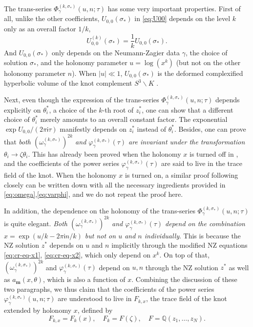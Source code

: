 \documentclass[a4paper,11pt]{article}	%
\def\IQ{\mathbb{Q}}
\newcommand{\ri}{{\mathsf{i}}}
\newcommand{\s}{\sigma}
\begin{document}
The trans-series $\Phi_\gamma^{(k,\sigma_*)}(u,n;\tau)$ has some very
important properties.
%
First of all, unlike the other coefficients, $U_{0,0}(\sigma_*)$ in
\eqref{eq:U00} depends on the level $k$ only as an overall factor
$1/k$,
\begin{equation}
  U^{(k)}_{0,0}(\sigma_*) = \frac{1}{k} U_{0,0}(\sigma_*).
  \label{eq:U00k}
\end{equation}
And $U_{0,0}(\sigma_*)$ only depends on the Neumann-Zagier data
$\gamma$, the choice of solution $\sigma_*$, and the holonomy
parameter $u = \log(x^k)$ (but not on the other holonomy parameter
$n$).  When $|u|\ll 1$, $U_{0,0}(\sigma_*)$ is the deformed
complexified hyperbolic volume of the knot complement
$S^3\backslash K$ \cite{Gukov:2003na}.

Next, even though the expression of the trans-series
$\Phi_\gamma^{(k,\s_*)}(u,n;\tau)$ depends explicitly on
$\theta_i^*$, a choice of the $k$-th root of $z_i^*$, one can show
that a different choice of $\theta_i^*$ merely amounts to an overall
constant factor.
%
The exponential $\exp U_{0,0}/(2\pi\ri \tau)$ manifestly
depends on $z_i^*$ instead of $\theta_i^*$.
%
Besides, one can prove that \emph{both
  $(\omega_{\gamma}^{(k,\sigma_*)})^{2k}$ and
  $\varphi_{\gamma}^{(k,\sigma_*)}(\tau)$ are invariant under the
  transformation $\theta_i\rightarrow \zeta\theta_i$}.  This has
already been proved when the holonomy $x$ is turned off in
\cite{Dimofte:2015kkp}, and the coefficients of the power series
$\varphi_{\gamma}^{(k,\sigma_*)}(\tau)$ are said to live in the trace
field of the knot.
%
When the holonomy $x$ is turned on, a similar proof following closely
\cite{Dimofte:2015kkp} can be written down with all the necessary
ingredients provided in \eqref{eq:omega},\eqref{eq:varphi}, and we do
not repeat the proof here.

In addition, the dependence on the holonomy of the trans-series
$\Phi_\gamma^{(k,\s_*)}(u,n;\tau)$ is quite elegant.  \emph{Both
  $(\omega_{\gamma}^{(k,\sigma_*)})^{2k}$ and
  $\varphi_{\gamma}^{(k,\sigma_*)}(\tau)$ depend on the combination
  $x = \exp(u/k - 2\pi\ri n/k)$ but not on $u$ and $n$ individually}.
This is because the NZ solution $z^*$ depends on $u$ and $n$
implicitly through the modified NZ equations \eqref{eq:cr-eq-x1},
\eqref{eq:cr-eq-x2}, which only depend on $x^k$.  On top of that,
$(\omega_{\gamma}^{(k,\s_*)})^{2k}$ and
$\varphi_{\gamma}^{(k,\s_*)}(\tau)$ depend on $u,n$ through the NZ
solution $z^*$ as well as $a_{\pmb{m}}(x,\theta)$, which is also a
function of $x$.
%
Combining the discussion of these two paragraphs, we thus claim that
the coefficients of the power series
$\varphi_\gamma^{(k,\s_*)}(u,n;\tau)$ are understood to live in
$F_{k,x}$, the trace field of the knot extended by holonomy $x$,
defined by
\begin{equation}
  F_{k,x} = F_k(x),\quad F_k = F(\zeta), \quad F = \IQ(z_1,\ldots,z_N).
\end{equation}
\end{document}

